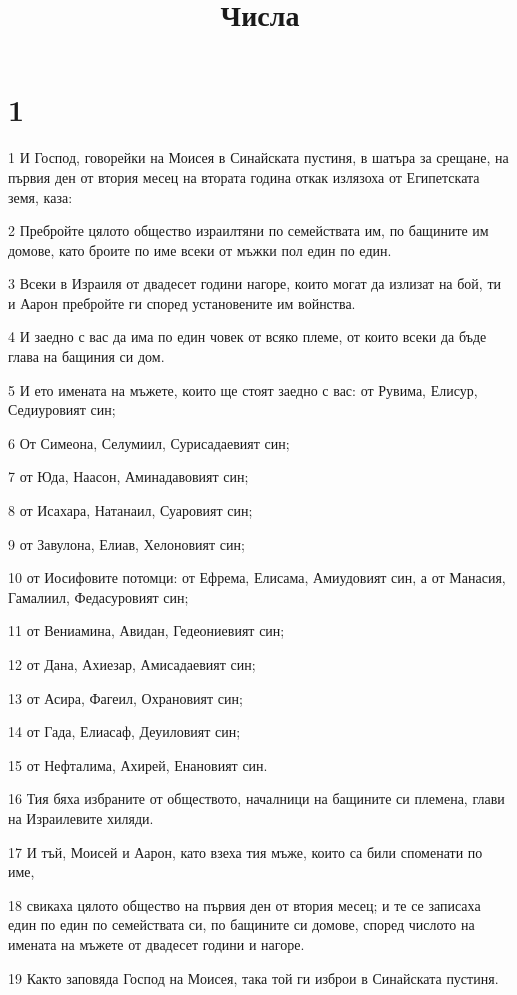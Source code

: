 

\title{Числа}


\chapter{1}

\par 1 И Господ, говорейки на Моисея в Синайската пустиня, в шатъра за срещане, на първия ден от втория месец на втората година откак излязоха от Египетската земя, каза:
\par 2 Пребройте цялото общество израилтяни по семействата им, по бащините им домове, като броите по име всеки от мъжки пол един по един.
\par 3 Всеки в Израиля от двадесет години нагоре, които могат да излизат на бой, ти и Аарон пребройте ги според установените им войнства.
\par 4 И заедно с вас да има по един човек от всяко племе, от които всеки да бъде глава на бащиния си дом.
\par 5 И ето имената на мъжете, които ще стоят заедно с вас: от Рувима, Елисур, Седиуровият син;
\par 6 От Симеона, Селумиил, Сурисадаевият син;
\par 7 от Юда, Наасон, Аминадавовият син;
\par 8 от Исахара, Натанаил, Суаровият син;
\par 9 от Завулона, Елиав, Хелоновият син;
\par 10 от Иосифовите потомци: от Ефрема, Елисама, Амиудовият син, а от Манасия, Гамалиил, Федасуровият син;
\par 11 от Вениамина, Авидан, Гедеониевият син;
\par 12 от Дана, Ахиезар, Амисадаевият син;
\par 13 от Асира, Фагеил, Охрановият син;
\par 14 от Гада, Елиасаф, Деуиловият син;
\par 15 от Нефталима, Ахирей, Енановият син.
\par 16 Тия бяха избраните от обществото, началници на бащините си племена, глави на Израилевите хиляди.
\par 17 И тъй, Моисей и Аарон, като взеха тия мъже, които са били споменати по име,
\par 18 свикаха цялото общество на първия ден от втория месец; и те се записаха един по един по семействата си, по бащините си домове, според числото на имената на мъжете от двадесет години и нагоре.
\par 19 Както заповяда Господ на Моисея, така той ги изброи в Синайската пустиня.
